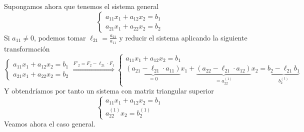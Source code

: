     \begin{obs}
        Supongamos ahora que tenemos el sistema general 
        $$\left\{ \begin{array}{l}
                 a_{11}x_1 + a_{12}x_2 = b_1  \\
                 a_{21}x_1 + a_{22}x_2 = b_2 
            \end{array}\right.$$
            Si $a_{11} \neq 0$, podemos tomar $\ell_{21}=\frac{a_{21}}{a_{11}}$ y reducir el sistema aplicando la siguiente transformación
             $$\left\{ \begin{array}{l}
                 a_{11}x_1 + a_{12}x_2 = b_1  \\
                 a_{21}x_1 + a_{22}x_2 = b_2 
            \end{array}\right.\overset{F'_2=F_2-\ell_{21}\cdot F_1}{\Longrightarrow}
             \left\{ \begin{array}{l}
                 a_{11}x_1 + a_{12}x_2 = b_1  \\
                 \underbrace{(a_{21}-\ell_{21} \cdot a_{11})}_{=0}x_1+\underbrace{(a_{22}-\ell_{21} \cdot a_{12})}_{=a_{22}^{(1)}}x_2=\underbrace{b_2-\ell_{21}b_1}_{b_2^{(1)}} 
            \end{array}\right.$$
            Y obtendríamos por tanto un sistema con matriz triangular superior
            $$\left\{ \begin{array}{l}
                 a_{11}x_1 + a_{12}x_2 = b_1  \\
                  a^{(1)}_{22}x_2 = b^{(1)}_2 
            \end{array}\right.$$
            Veamos ahora el caso general.
            \end{obs}
